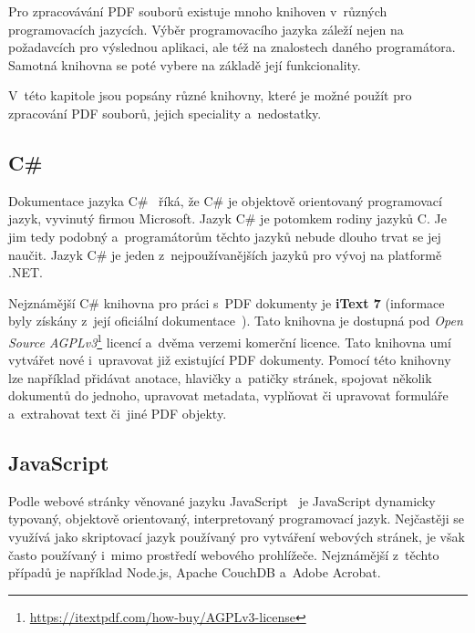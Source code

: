 Pro zpracovávání PDF souborů existuje mnoho knihoven v~různých programovacích
jazycích. Výběr programovacího jazyka záleží nejen na požadavcích pro výslednou
aplikaci, ale též na znalostech daného programátora. Samotná knihovna se poté
vybere na základě její funkcionality. 

V~této kapitole jsou popsány různé knihovny, které je možné použít pro zpracování
PDF souborů, jejich speciality a~nedostatky.


\subsection*{C\#}

Dokumentace jazyka C\#~\cite{CSharp} říká, že  C\# je objektově orientovaný 
programovací jazyk, vyvinutý firmou Microsoft.
Jazyk C\# je potomkem rodiny jazyků C. Je jim tedy podobný a~programátorům těchto
jazyků nebude dlouho trvat se jej naučit. Jazyk C\# je jeden z~nejpoužívanějších
jazyků pro vývoj na platformě .NET.

Nejznámější C\# knihovna pro práci s~PDF dokumenty je \textbf{iText 7}
(informace byly získány z~její oficiální dokumentace~\cite{iText_7}). 
Tato knihovna je dostupná pod \emph{Open Source AGPLv3}\footnote{
\href{https://itextpdf.com/how-buy/AGPLv3-license}{https://itextpdf.com/how-buy/AGPLv3-license}
} licencí a~dvěma verzemi komerční licence. Tato knihovna umí vytvářet nové
i~upravovat již existující PDF dokumenty. Pomocí této knihovny lze například
přidávat anotace, hlavičky a~patičky stránek, spojovat několik dokumentů do
jednoho, upravovat metadata, vyplňovat či upravovat formuláře a~extrahovat 
text či~jiné PDF objekty.


\subsection*{JavaScript}
Podle webové stránky věnované jazyku JavaScript~\cite{JavaScript} je
JavaScript dynamicky typovaný, objektově orientovaný, interpretovaný
programovací jazyk. Nejčastěji se využívá jako skriptovací jazyk používaný
pro vytváření webových stránek, je však často používaný i~mimo prostředí webového
prohlížeče. Nejznámější z~těchto případů je například Node.js, Apache CouchDB
a~Adobe Acrobat. 

